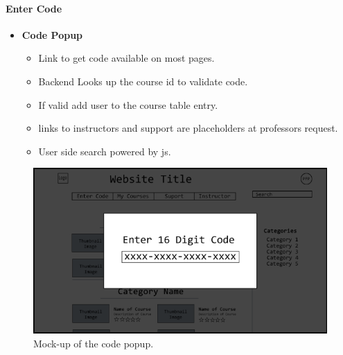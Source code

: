 \documentclass{article}
\begin{document}
\paragraph{Enter Code}
\vspace{\baselineskip}
\begin{itemize}
    \item \textbf{Code Popup}
        \begin{itemize}
        \item Link to get code available on most pages.
        \item Backend Looks up the course id to validate code.
        \item If valid add user to the course table entry.
        \item links to instructors and support are placeholders at professors request.
        \item User side search powered by js.
    \end{itemize}
\end{itemize}
\begin{figure}[h!]
    \caption{Mock-up of the code popup.}
    \includegraphics[width=\textwidth]{enter_code}
\end{figure}

\newpage
\end{document}
